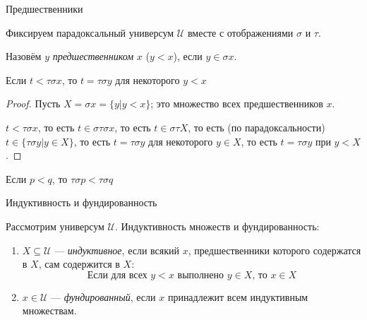 \documentclass[aspectratio=169,dvipsnames,usenames]{beamer}
\begin{document}
\begin{frame}{Предшественники}

Фиксируем парадоксальный универсум $\mathcal{U}$ вместе с отображениями $\sigma$ и $\tau$.

\begin{definition}
Назовём $y$ \emph{предшественником} $x$ ($y < x$), если $y \in \sigma x$.
\end{definition}

\begin{lemma}
Если $t < \tau\sigma x$, то $t = \tau\sigma y$ для некоторого $y < x$
\end{lemma}
\begin{proof}
Пусть $X = \sigma x = \{ y | y < x \}$; это множество всех предшественников $x$.

$t < \tau\sigma x$, то есть $t \in \sigma\tau\sigma x$, то есть $t \in \sigma\tau X$, то есть (по парадоксальности) $t \in \{\tau\sigma y | y \in X \}$,
то есть $t = \tau\sigma y$ для некоторого $y \in X$, то есть $t = \tau\sigma y$ при $y < X$.
\end{proof}
\begin{lemma}
Если $p < q$, то $\tau\sigma p < \tau\sigma q$
\end{lemma}

\end{frame}

\begin{frame}{Индуктивность и фундированность}

\begin{definition} Рассмотрим универсум $\mathcal{U}$. Индуктивность множеств и фундированность:

\begin{enumerate}
\item $X \subseteq \mathcal{U}$ --- \emph{индуктивное}, если всякий $x$, предшественники которого содержатся в $X$, сам содержится в $X$:
$$\text{Если для всех }y < x\text{ выполнено }y \in X\text{, то }x \in X$$

\item $x \in \mathcal{U}$ --- \emph{фундированный}, если $x$ принадлежит всем индуктивным множествам.
\end{enumerate}
\end{definition}
\end{frame}
\end{document}
